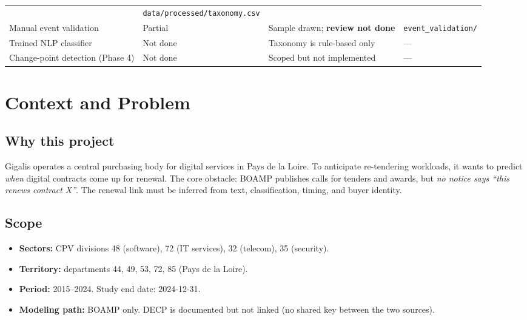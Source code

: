 \documentclass[11pt,a4paper]{article}
\begin{document}
\begin{landscape}
\begin{table}[p]
\begin{tabular}{@{}p{4.2cm}p{1.6cm}p{5.4cm}p{10.0cm}@{}}
  & \nolinkurl{data/processed/taxonomy.csv} \\[3pt]
Manual event validation
  & \textcolor{partial}{Partial}
  & Sample drawn; \textbf{review not done}
  & \nolinkurl{event_validation/} \\[3pt]
Trained NLP classifier
  & \textcolor{notdone}{Not done}
  & Taxonomy is rule-based only
  & --- \\[3pt]
Change-point detection (Phase 4)
  & \textcolor{notdone}{Not done}
  & Scoped but not implemented
  & --- \\
\bottomrule
\end{tabular}
\end{table}
\end{landscape}

\section{Context and Problem}

\subsection{Why this project}
Gigalis operates a central purchasing body for digital services in Pays de la
Loire. To anticipate re-tendering workloads, it wants to predict \emph{when}
digital contracts come up for renewal. The core obstacle: BOAMP publishes
calls for tenders and awards, but \emph{no notice says ``this renews contract X''}.
The renewal link must be inferred from text, classification, timing, and buyer
identity.

\subsection{Scope}
\begin{itemize}[leftmargin=1.4em,itemsep=1pt]
  \item \textbf{Sectors:} CPV divisions 48 (software), 72 (IT services), 32 (telecom), 35 (security).
  \item \textbf{Territory:} departments 44, 49, 53, 72, 85 (Pays de la Loire).
  \item \textbf{Period:} 2015--2024. Study end date: 2024-12-31.
  \item \textbf{Modeling path:} BOAMP only. DECP is documented but not linked
        (no shared key between the two sources).
\end{itemize}
\end{document}
